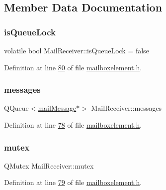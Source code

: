 \subsection{Member Data Documentation}
\mbox{\label{a00197_a33c370cb3c6292cd800008a67002a67f}} 
\subsubsection{\texorpdfstring{is\+Queue\+Lock}{isQueueLock}}
{\footnotesize\ttfamily volatile bool Mail\+Receiver\+::is\+Queue\+Lock = false\hspace{0.3cm}{\ttfamily [protected]}}



Definition at line \hyperlink{a00002_source_l00080}{80} of file \hyperlink{a00002_source}{mailboxelement.\+h}.

\mbox{\label{a00197_ace6950e3788bb037f23ce8668ef83829}} 
\subsubsection{\texorpdfstring{messages}{messages}}
{\footnotesize\ttfamily Q\+Queue$<$\hyperlink{a00201}{mail\+Message}$\ast$$>$ Mail\+Receiver\+::messages\hspace{0.3cm}{\ttfamily [protected]}}



Definition at line \hyperlink{a00002_source_l00078}{78} of file \hyperlink{a00002_source}{mailboxelement.\+h}.

\mbox{\label{a00197_a116d4905d302bdb69c00b54b621dd827}} 
\subsubsection{\texorpdfstring{mutex}{mutex}}
{\footnotesize\ttfamily Q\+Mutex Mail\+Receiver\+::mutex\hspace{0.3cm}{\ttfamily [protected]}}



Definition at line \hyperlink{a00002_source_l00079}{79} of file \hyperlink{a00002_source}{mailboxelement.\+h}.

